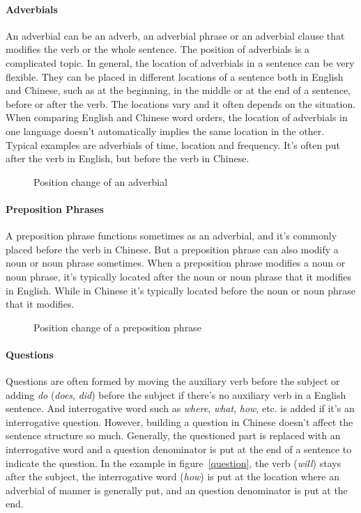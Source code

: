 \paragraph{Adverbials}
An adverbial can be an adverb, an adverbial phrase or an adverbial clause that modifies the verb or the whole sentence. The position of adverbials is a complicated topic. In general, the location of adverbials in a sentence can be very flexible. They can be placed in different locations of a sentence both in English and Chinese, such as at the beginning, in the middle or at the end of a sentence, before or after the verb. The locations vary and it often depends on the situation. When comparing English and Chinese word orders, the location of adverbials in one language doesn't automatically implies the same location in the other. Typical examples are adverbials of time, location and frequency. It's often put after the verb in English, but before the verb in Chinese. 
\begin{figure}[H]
\centering

\caption{Position change of an adverbial}
\end{figure}

\paragraph{Preposition Phrases}
A preposition phrase functions sometimes as an adverbial, and it's commonly placed before the verb in Chinese. But a preposition phrase can also modify a noun or noun phrase sometimes. When a preposition phrase modifies a noun or noun phrase, it's typically located after the noun or noun phrase that it modifies in English. While in Chinese it's typically located before the noun or noun phrase that it modifies.

\begin{figure}[H]
\centering

\caption{Position change of a preposition phrase}
\end{figure}

\paragraph{Questions}
Questions are often formed by moving the auxiliary verb before the subject or adding \emph{do} (\emph{does}, \emph{did}) before the subject if there's no auxiliary verb in a English sentence. And interrogative word such as \emph{where}, \emph{what}, \emph{how}, etc. is added if it's an interrogative question. However, building a question in Chinese doesn't affect the sentence structure so much. Generally, the questioned part is replaced with an interrogative word and a question denominator is put at the end of a sentence to indicate the question. In the example in figure~\ref{question}, the verb  (\textit{will}) stays after the subject, the interrogative word  (\textit{how}) is put at the location where an adverbial of manner is generally put, and an question denominator  is put at the end.

